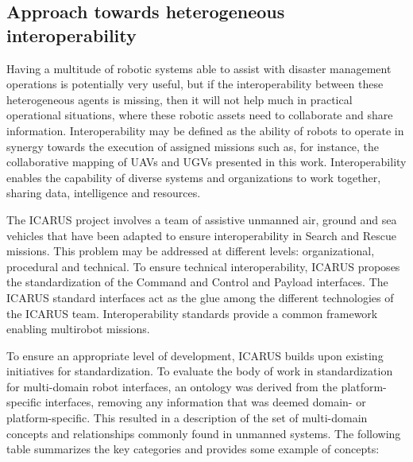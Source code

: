 \documentclass{article}
\begin{document}
\subsection{Approach towards heterogeneous interoperability}
Having a multitude of robotic systems able to assist with disaster management operations is potentially very useful, but if the interoperability between these heterogeneous agents is missing, then it will not help much in practical operational situations, where these robotic assets need to collaborate and share information.
Interoperability may be defined as the ability of robots to operate in synergy towards the execution of assigned missions such as, for instance, the collaborative mapping of UAVs and UGVs presented in this work. Interoperability enables the capability of diverse systems and organizations to work together, sharing data, intelligence and resources.

The ICARUS project involves a team of assistive unmanned air, ground and sea vehicles that have been adapted to ensure interoperability in Search and Rescue missions. This problem may be addressed at different levels: organizational, procedural and technical. To ensure technical interoperability, ICARUS proposes the standardization of the Command and Control and Payload interfaces. The ICARUS standard interfaces act as the glue among the different technologies of the ICARUS team. Interoperability standards provide a common framework enabling multirobot missions.

To ensure an appropriate level of development, ICARUS builds upon existing initiatives for standardization. To evaluate the body of work in standardization for multi-domain robot interfaces, an ontology was derived from the platform-specific interfaces, removing any information that was deemed domain- or platform-specific. This resulted in a description of the set of multi-domain concepts and relationships commonly found in unmanned systems. The following table summarizes the key categories and provides some example of concepts:
\end{document}
